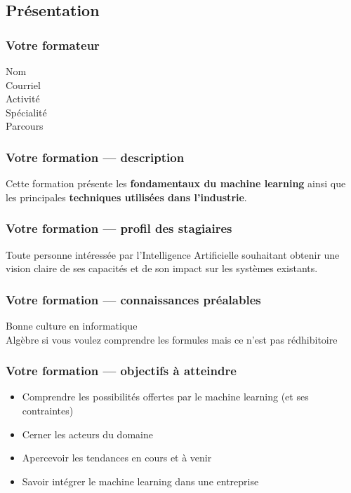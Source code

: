 \subsection{Présentation}

\begin{frame}
  \frametitle{Votre formateur}
  \begin{description}
  \item[Nom] \TrainerName
  \item[Courriel] \TrainerEmail
  \item[Activité] \TrainerActivity
  \item[Spécialité] \TrainerSpecialization
  \item[Parcours] \TrainerTraining
  \end{description}
\end{frame}

\begin{frame}
  \frametitle{Votre formation — description}
  Cette formation présente les \textbf{fondamentaux du machine learning} ainsi que les principales \textbf{techniques utilisées dans l’industrie}.
\end{frame}

\begin{frame}
  \frametitle{Votre formation — profil des stagiaires}
  Toute personne intéressée par l'Intelligence Artificielle souhaitant obtenir une vision claire de ses capacités et de son impact sur les systèmes existants.
\end{frame}

\begin{frame}
  \frametitle{Votre formation — connaissances préalables}
  Bonne culture en informatique \\
  Algèbre si vous voulez comprendre les formules mais ce n'est pas rédhibitoire
\end{frame}

\begin{frame}
  \frametitle{Votre formation — objectifs à atteindre}
  \begin{itemize}
  \item Comprendre les possibilités offertes par le machine learning (et ses contraintes)
  \item Cerner les acteurs du domaine
  \item Apercevoir les tendances en cours et à venir
  \item Savoir intégrer le machine learning dans une entreprise
  \end{itemize}
\end{frame}

